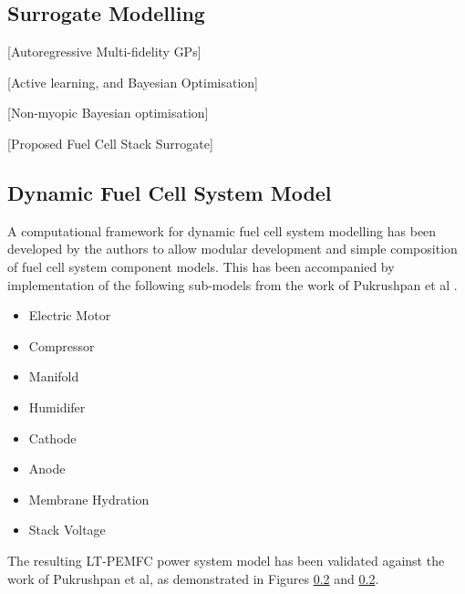 
\subsection{Surrogate Modelling}

[Autoregressive Multi-fidelity GPs]

[Active learning, and Bayesian Optimisation]

[Non-myopic Bayesian optimisation]

[Proposed Fuel Cell Stack Surrogate]

\subsection{Dynamic Fuel Cell System Model}

A computational framework for dynamic fuel cell system modelling has been developed by the authors to allow modular development and simple composition of fuel cell system component models. This has been accompanied by implementation of the following sub-models from the work of Pukrushpan et al \cite{pukrushpanControlFuelCell2004a}.
\begin{multicols}{2}
	\begin{itemize}
		\item Electric Motor
		\item Compressor
		\item Manifold
		\item Humidifer
		\item Cathode
		\item Anode
		\item Membrane Hydration
		\item Stack Voltage
	\end{itemize}
\end{multicols}
\vspace{-1em}
The resulting LT-PEMFC power system model has been validated against the work of Pukrushpan et al, as demonstrated in Figures \ref{} and \ref{}.

